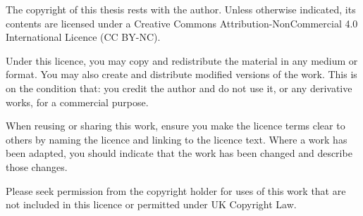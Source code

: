\begin{license}
	The copyright of this thesis rests with the author. Unless otherwise indicated, its contents are licensed under a Creative Commons Attribution-NonCommercial 4.0 International Licence (CC BY-NC).

	Under this licence, you may copy and redistribute the material in any medium or format. You may also create and distribute modified versions of the work. This is on the condition that: you credit the author and do not use it, or any derivative works, for a commercial purpose.

	When reusing or sharing this work, ensure you make the licence terms clear to others by naming the licence and linking to the licence text. Where a work has been adapted, you should indicate that the work has been changed and describe those changes.

	Please seek permission from the copyright holder for uses of this work that are not included in this licence or permitted under UK Copyright Law.
\end{license}
